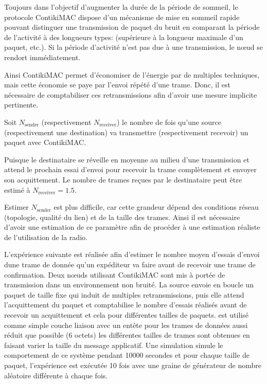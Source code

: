 Toujours dans l’objectif d’augmenter la durée de la période de sommeil, le protocole ContikiMAC dispose d'un mécanisme de mise en sommeil rapide pouvant distinguer une transmission de paquet du bruit en comparant la période de l’activité à des longueurs types: (supérieure à la longueur maximale d’un paquet, etc.).
Si la période d'activité n'est pas due à une transmission, le nœud se rendort immédiatement.

Ainsi ContikiMAC permet d'économiser de l'énergie par de multiples techniques, mais cette économie se paye par l'envoi répété d'une trame.
Donc, il est nécessaire de comptabiliser ces retransmissions afin d'avoir une mesure implicite pertinente.

Soit $N_{\textrm{sender}}$ (respectivement $N_{\textrm{receiver}}$) le nombre de fois qu'une source (respectivement une destination) va transmettre (respectivement recevoir) un paquet avec ContikiMAC.

Puisque le destinataire se réveille en moyenne au milieu d'une transmission et attend le prochain essai d'envoi pour recevoir la trame complètement et envoyer son acquittement.
Le nombre de trames reçues par le destinataire peut être estimé à $N_{\textrm{receiver}} = 1.5$.

Estimer $N_{\textrm{sender}}$ est plus difficile, car cette grandeur dépend des conditions réseau (topologie, qualité du lien) et de la taille des trames.
Ainsi il est nécessaire d'avoir une estimation de ce paramètre afin de procéder à une estimation réaliste de l'utilisation de la radio.

L'expérience suivante est réalisée afin d'estimer le nombre moyen d'essais d'envoi dune trame de donnée qu'un expéditeur va faire avant de recevoir une trame de confirmation.
Deux nœuds utilisant ContikiMAC sont mis à portée de transmission dans un environnement non bruité.
La source envoie en boucle un paquet de taille fixe qui induit de multiples retransmissions, puis elle attend l'acquittement du paquet et comptabilise le nombre d'essais réalisés avant de recevoir un acquittement et cela pour différentes tailles de paquets.
\ieee{} est utilisé comme simple couche liaison avec un entête pour les trames de données aussi réduit que possible (6 octets) les différentes tailles de trames sont obtenues en faisant varier la taille du message applicatif.
Une simulation simule le comportement de ce système pendant 10000 secondes et pour chaque taille de paquet, l'expérience est exécutée 10 fois avec une graine de générateur de nombre aléatoire différente à chaque fois.

